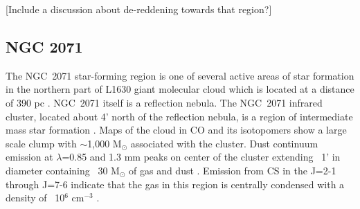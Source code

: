 

[Include a discussion about de-reddening towards that region?]

\subsection{NGC 2071}
The NGC~2071 star-forming region is one of several active areas of star formation in the northern part of L1630 giant molecular cloud which is located at a distance of 390 pc \citep{A-T1982}. 
NGC~2071 itself is a reflection nebula.
The NGC~2071 infrared cluster, located about 4' north of the reflection nebula, is a region of intermediate mass star formation \citep{Strom1976, Persson1981, Butner1990}. Maps of the cloud in CO and its isotopomers \citep{Buckle2010} show a large scale clump with $\sim$1,000 M$_\odot$ associated with the cluster. Dust continuum emission at $\lambda$=0.85 and 1.3 mm peaks on center of the cluster extending ~1' in diameter containing ~30 M$_\odot$ of gas and dust \citep{Johnstone2001,Mitchell2001,Launhardt1996}. Emission from CS in the J=2-1 through J=7-6 indicate that the gas in this region is centrally condensed with a density of ~10$^6$ cm$^{-3}$ \citep{Zhou1990}. 


